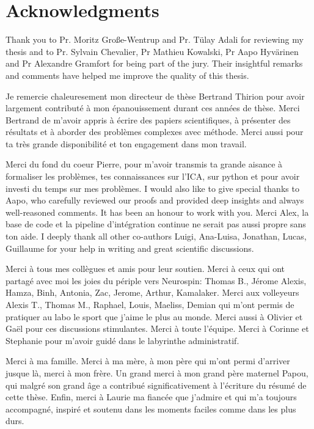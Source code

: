 
\bigskip

\begingroup
\let\clearpage\relax
\let\cleardoublepage\relax
\let\cleardoublepage\relax
\chapter*{Acknowledgments}
Thank you to Pr. Moritz Gro{\ss}e-Wentrup and Pr. T{\"u}lay Adali for reviewing
my thesis and to Pr. Sylvain Chevalier, Pr Mathieu Kowalski, Pr Aapo
Hyv{\"a}rinen and Pr Alexandre Gramfort for being part of the jury.
Their insightful remarks and comments have helped me improve the quality of this thesis.

Je remercie chaleuresement mon directeur de thèse Bertrand Thirion pour avoir
largement contributé à mon épanouissement durant ces années de thèse. Merci
Bertrand de m'avoir appris à écrire des papiers scientifiques,
à présenter des résultats et à aborder des problèmes complexes avec méthode.
Merci aussi pour ta très grande disponibilité et ton engagement dans mon travail.

Merci du fond du coeur Pierre, pour m'avoir transmis ta grande aisance à
formaliser les problèmes, tes connaissances sur l'ICA, sur python et pour avoir
investi du temps sur mes problèmes.
I would also like to give special thanks to Aapo, who carefully reviewed our proofs and provided deep insights and always well-reasoned comments. It has been an honour to work with you.
Merci Alex, la base de code et la pipeline d'intégration continue
ne serait pas aussi propre sans ton aide.
I deeply thank all other co-authors Luigi, Ana-Luisa, Jonathan, Lucas, Guillaume
for your help in writing and great scientific discussions.

Merci à tous mes collègues et amis pour leur soutien. Merci à ceux qui ont partagé avec moi les joies du
périple vers Neurospin: Thomas B., Jérome
Alexis, Hamza, Binh, Antonia, Zac, Jerome, Arthur, Kamalaker. Merci aux volleyeurs
Alexis T., Thomas M., Raphael, Louis, Maeliss, Demian qui m'ont permis de pratiquer au
labo le sport que j'aime le plus au monde.
Merci aussi à Olivier et Gaël pour ces discussions stimulantes.
Merci à toute l'équipe. Merci à Corinne et Stephanie pour m'avoir guidé dans le labyrinthe
administratif.

Merci à ma famille. Merci à ma mère, à mon père qui m'ont permi d'arriver
jusque là, merci à mon frère. Un grand merci à mon grand
père maternel Papou, qui malgré son grand âge a contribué significativement à
l'écriture du résumé de cette thèse.
Enfin, merci à Laurie ma fiancée que j'admire et qui m'a toujours accompagné,
inspiré et soutenu dans les moments faciles comme dans les plus durs.

\endgroup
